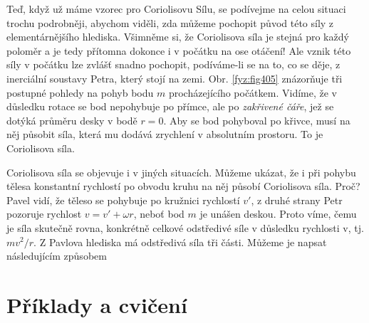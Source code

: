    Teď, když už máme vzorec pro Coriolisovu Sílu, se podívejme na celou situaci trochu podrobněji,
    abychom viděli, zda můžeme pochopit původ této síly z elementárnějšího hlediska. Všimněme si, že
    Coriolisova síla je stejná pro každý poloměr a je tedy přítomna dokonce i v počátku na ose
    otáčení! Ale vznik této síly v počátku lze zvlášť snadno pochopit, podíváme-li se na to, co se
    děje, z inerciální soustavy Petra, který stojí na zemi. Obr. \ref{fyz:fig405} znázorňuje tři
    postupné pohledy na pohyb bodu \(m\) procházejícího počátkem. Vidíme, že v důsledku rotace se
    bod nepohybuje po přímce, ale po \emph{zakřivené čáře}, jež se dotýká průměru desky v bodě
    \(r=0\). Aby se bod pohyboval po křivce, musí na něj působit síla, která mu dodává zrychlení v
    absolutním prostoru. To je Coriolisova síla.
    
    Coriolisova síla se objevuje i v jiných situacích. Můžeme ukázat, že i při pohybu tělesa
    konstantní rychlostí po obvodu kruhu na něj působí Coriolisova síla. Proč? Pavel vidí, že těleso
    se pohybuje po kružnici rychlostí \(v'\), z druhé strany Petr pozoruje rychlost \(v = v' + ωr\),
    neboť bod \(m\) je unášen deskou. Proto víme, čemu je síla skutečně rovna, konkrétně celkové
    odstředivé síle v důsledku rychlosti v, tj. \(mv^2/r\). Z Pavlova hlediska má odstředivá síla
    tři části. Můžeme je napsat následujícím způsobem
    

    
  \section{Příklady a cvičení}\label{fyz:IchapXIXsecV}

